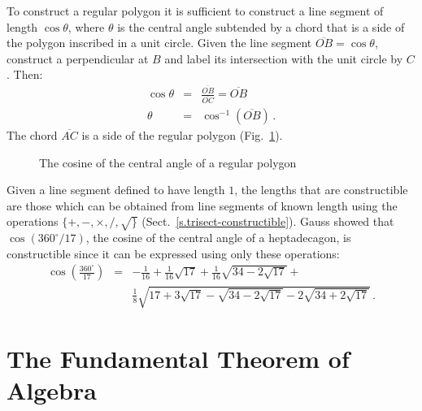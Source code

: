 To construct a regular polygon it is sufficient to construct a line segment of length $\cos \theta$, where $\theta$ is the central angle subtended by a chord that is a side of the polygon inscribed in a unit circle. Given the line segment $\overline{OB}=\cos\theta$, construct a perpendicular at $B$ and label its intersection with the unit circle by $C$. Then:
\begin{eqnarray*}
\cos \theta&=&\displaystyle\frac{\overline{OB}}{\overline{OC}}=\overline{OB}\\
\theta &=& \cos^{-1} (\overline{OB})\,.
\end{eqnarray*}
The chord $\overline{AC}$ is a side of the regular polygon (Fig.~\ref{f.hept-central1}).
\begin{figure}[b]
\begin{center}
\end{center}
\caption{The cosine of the central angle of a regular polygon}\label{f.hept-central1}
\end{figure}

Given a line segment defined to have length $1$, the lengths that are constructible are those which can be obtained from line segments of known length using the operations $\{+,-,\times,/,\surd\}$ (Sect.~\ref{s.trisect-constructible}). Gauss showed that $\cos(360^\circ/17)$, the cosine of the central angle of a heptadecagon, is constructible since it can be expressed using only these operations:
\begin{eqnarray*}
\cos\left(\frac{360^\circ}{17}\right) &=& 
-\frac{1}{16}+\frac{1}{16}\sqrt{17} + 
     \frac{1}{16}\sqrt{34-2\sqrt{17}}
    + \\
    &&
     \frac{1}{8}\sqrt{
     17+3\sqrt{17} - 
     \sqrt{34-2\sqrt{17}}
   -2
     \sqrt{34+2\sqrt{17}}
   }\,.
\end{eqnarray*}

\section{The Fundamental Theorem of Algebra}\label{s.fundamental}

